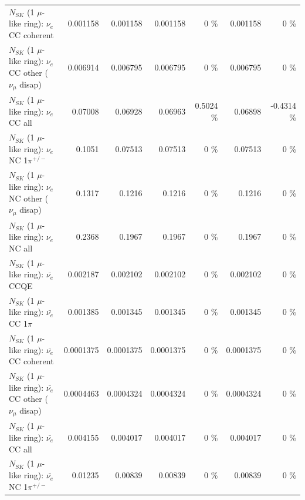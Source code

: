 \begin{table}
\begin{tabular}{| l | r | r | r  r | r  r |}
                               $N_{SK}$ (1 $\mu$-like ring): $\nu_e$ CC coherent &        0.001158 &        0.001158 &        0.001158 &        0 \%  &        0.001158 &        0 \%  \\ 
                $N_{SK}$ (1 $\mu$-like ring): $\nu_e$ CC other ($\nu_\mu$ disap) &        0.006914 &        0.006795 &        0.006795 &        0 \%  &        0.006795 &        0 \%  \\ 
                                  $N_{SK}$ (1 $\mu$-like ring): $\nu_{e}$ CC all &         0.07008 &         0.06928 &         0.06963 &   0.5024 \%  &         0.06898 &  -0.4314 \%  \\ 
\hline
                           $N_{SK}$ (1 $\mu$-like ring): $\nu_e$ NC 1$\pi^{+/-}$ &          0.1051 &         0.07513 &         0.07513 &        0 \%  &         0.07513 &        0 \%  \\ 
                $N_{SK}$ (1 $\mu$-like ring): $\nu_e$ NC other ($\nu_\mu$ disap) &          0.1317 &          0.1216 &          0.1216 &        0 \%  &          0.1216 &        0 \%  \\ 
                                  $N_{SK}$ (1 $\mu$-like ring): $\nu_{e}$ NC all &          0.2368 &          0.1967 &          0.1967 &        0 \%  &          0.1967 &        0 \%  \\ 
\hline
\hline
\hline
                                $N_{SK}$ (1 $\mu$-like ring): $\bar{\nu_e}$ CCQE &        0.002187 &        0.002102 &        0.002102 &        0 \%  &        0.002102 &        0 \%  \\ 
                           $N_{SK}$ (1 $\mu$-like ring): $\bar{\nu_e}$ CC 1$\pi$ &        0.001385 &        0.001345 &        0.001345 &        0 \%  &        0.001345 &        0 \%  \\ 
                         $N_{SK}$ (1 $\mu$-like ring): $\bar{\nu_e}$ CC coherent &       0.0001375 &       0.0001375 &       0.0001375 &        0 \%  &       0.0001375 &        0 \%  \\ 
          $N_{SK}$ (1 $\mu$-like ring): $\bar{\nu_e}$ CC other ($\nu_\mu$ disap) &       0.0004463 &       0.0004324 &       0.0004324 &        0 \%  &       0.0004324 &        0 \%  \\ 
                            $N_{SK}$ (1 $\mu$-like ring): $\bar{\nu_{e}}$ CC all &        0.004155 &        0.004017 &        0.004017 &        0 \%  &        0.004017 &        0 \%  \\ 
\hline
                     $N_{SK}$ (1 $\mu$-like ring): $\bar{\nu_e}$ NC 1$\pi^{+/-}$ &         0.01235 &         0.00839 &         0.00839 &        0 \%  &         0.00839 &        0 \%  \\ 

\end{tabular}
\end{table}
